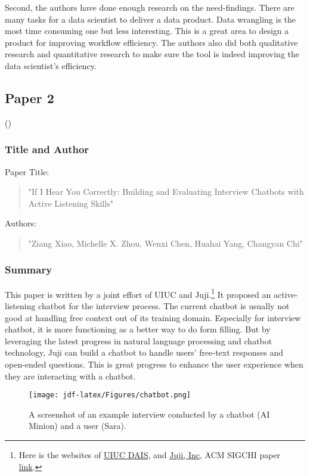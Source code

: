 \documentclass[
	letterpaper, %
]{jdf}
\begin{document}
Second, the authors have done enough research on the need-findings. There are many tasks for a data scientist to deliver a data product. Data wrangling is the most time consuming one but less interesting. This is a great area to design a product for improving workflow efficiency. The authors also did both qualitative research and quantitative research to make sure the tool is indeed improving the data scientist's efficiency.


\subsection{Paper 2}
(\cite{10.1145/3313831.3376131})
\subsubsection{Title and Author}
Paper Title:
\begin{quotation}
\noindent "If I Hear You Correctly: Building and Evaluating Interview Chatbots with Active Listening Skills" 
\end{quotation}

Authors:
\begin{quotation}
\noindent "Ziang Xiao, Michelle X. Zhou, Wenxi Chen, Huahai Yang, Changyan Chi"
\end{quotation}

\subsubsection{Summary}
This paper is written by a joint effort of UIUC and Juji.\footnote{Here is the websites of \href{https://dais.cs.illinois.edu/}{UIUC DAIS}, and \href{https://juji.io/}{Juji, Inc}, ACM SIGCHI paper \href{https://dl.acm.org/doi/abs/10.1145/3313831.3376131}{link}.} It proposed an active-listening chatbot for the interview process. The current chatbot is usually not good at handling free context out of its training domain. Especially for interview chatbot, it is more functioning as a better way to do form filling. But by leveraging the latest progress in natural language processing and chatbot technology, Juji can build a chatbot to handle users' free-text responses and open-ended questions. This is great progress to enhance the user experience when they are interacting with a chatbot.

\begin{figure}[h]
	\centering
	\texttt{[image: jdf-latex/Figures/chatbot.png]}
	\caption{A screenshot of an example interview conducted
by a chatbot (AI Minion) and a user (Sara).}
	\label{fig:chatbot}
\end{figure}
\end{document}
